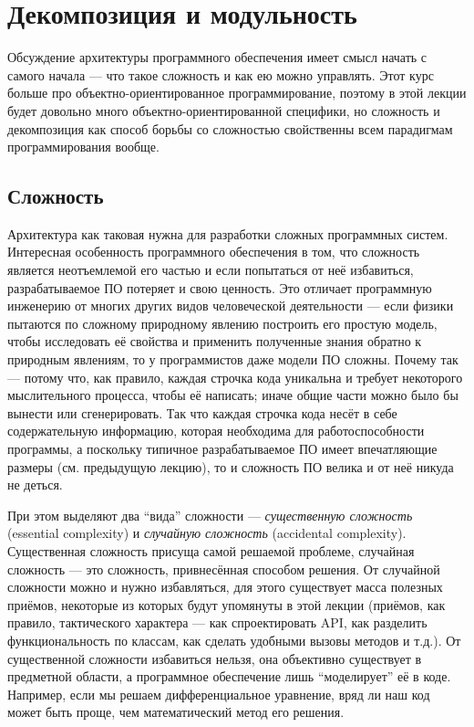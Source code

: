 \documentclass{../../text-style}
\begin{document}
\maketitle
\thispagestyle{empty}

\section{Декомпозиция и модульность}


Обсуждение архитектуры программного обеспечения имеет смысл начать с самого начала --- что такое сложность и как ею можно управлять. Этот курс больше про объектно-ориентированное программирование, поэтому в этой лекции будет довольно много объектно-ориентированной специфики, но сложность и декомпозиция как способ борьбы со сложностью свойственны всем парадигмам программирования вообще.

\subsection{Сложность}

Архитектура как таковая нужна для разработки сложных программных систем. Интересная особенность программного обеспечения в том, что сложность является неотъемлемой его частью и если попытаться от неё избавиться, разрабатываемое ПО потеряет и свою ценность. Это отличает программную инженерию от многих других видов человеческой деятельности --- если физики пытаются по сложному природному явлению построить его простую модель, чтобы исследовать её свойства и применить полученные знания обратно к природным явлениям, то у программистов даже модели ПО сложны. Почему так --- потому что, как правило, каждая строчка кода уникальна и требует некоторого мыслительного процесса, чтобы её написать; иначе общие части можно было бы вынести или сгенерировать. Так что каждая строчка кода несёт в себе содержательную информацию, которая необходима для работоспособности программы, а поскольку типичное разрабатываемое ПО имеет впечатляющие размеры (см. предыдущую лекцию), то и сложность ПО велика и от неё никуда не деться.

При этом выделяют два ``вида'' сложности --- \textit{существенную сложность} (essential complexity) и \textit{случайную сложность} (accidental complexity). Существенная сложность присуща самой решаемой проблеме, случайная сложность --- это сложность, привнесённая способом решения. От случайной сложности можно и нужно избавляться, для этого существует масса полезных приёмов, некоторые из которых будут упомянуты в этой лекции (приёмов, как правило, тактического характера --- как спроектировать API, как разделить функциональность по классам, как сделать удобными вызовы методов и т.д.). От существенной сложности избавиться нельзя, она объективно существует в предметной области, а программное обеспечение лишь ``моделирует'' её в коде. Например, если мы решаем дифференциальное уравнение, вряд ли наш код может быть проще, чем математический метод его решения.
\end{document}
